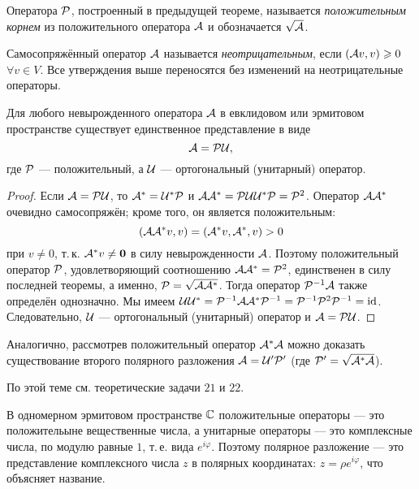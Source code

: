 \begin{definition}
    Оператора $\P$, построенный в предыдущей теореме, называется \textit{положительным корнем} из положительного оператора $\A$ и обозначается $\sqrt{\A}$.
\end{definition}

\begin{definition}
    Самосопряжённый оператор $\A$ называется \textit{неотрицательным}, если $(\A v, v) \geqslant 0$ $\forall v \in V$. Все утверждения выше переносятся без изменений на неотрицательные операторы.
\end{definition}

\begin{theorem}
    Для любого невырожденного оператора $\A$ в евклидовом или эрмитовом пространстве существует единственное представление в виде
    \[
        \A = \P\U,
    \]
    где $\P$ --- положительный, а $\U$ --- ортогональный (унитарный) оператор.
\end{theorem}

\begin{proof}
    Если $\A = \P\U$, то $\A^\ast = \U^\ast\P$ и $\A\A^\ast = \P\U\U^\ast\P = \P^2$. Оператор $\A\A^\ast$ очевидно самосопряжён; кроме того, он является положительным:
    \[
        (\A\A^\ast v, v) = (\A^\ast v, \A^\ast, v) > 0
    \]
    при $v \ne 0$, т.\,к. $\A^\ast v \ne \bs{0}$ в силу невырожденности $\A$. Поэтому положительный оператор $\P$, удовлетворяющий соотношению $\A\A^\ast = \P^2$, единственен в силу последней теоремы, а именно, $\P = \sqrt{\A\A^\ast}$. Тогда оператор $\P^{-1}\A$ также определён однозначно. Мы имеем $\U\U^\ast = \P^{-1}\A\A^\ast\P^{-1} = \P^{-1}\P^2\P^{-1} = \id$. Следовательно, $\U$ --- ортогональный (унитарный) оператор и $\A = \P\U$.
\end{proof}

Аналогично, рассмотрев положительный оператор $\A^\ast\A$ можно доказать существование второго полярного разложения $\A = \U^\prime\P^\prime$ (где $\P^\prime = \sqrt{\A^\ast\A}$).

По этой теме см. теоретические задачи $21$ и $22$.

В одномерном эрмитовом пространстве $\C$ положительные операторы --- это положительыне вещественные числа, а унитарные операторы --- это комплексные числа, по модулю равные $1$, т.\,е. вида $e^{i\varphi}$. Поэтому полярное разложение --- это представление комплексного числа $z$ в полярных координатах: $z = \rho e^{i\varphi}$, что объясняет название.

